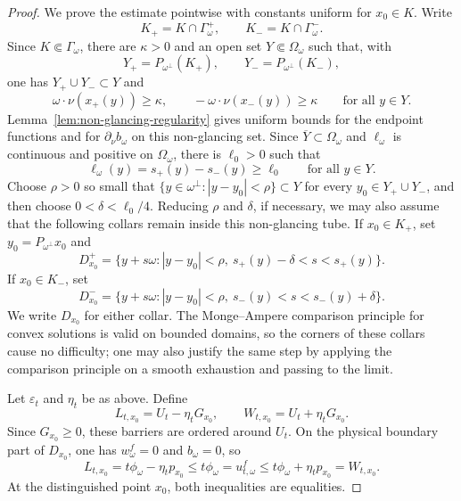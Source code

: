 \documentclass[10pt,a4paper]{amsart}
\begin{document}
\begin{proof}
We prove the estimate pointwise with constants uniform for \(x_0\in K\).  Write
\[
    K_+=K\cap\Gamma_\omega^+,
    \qquad
    K_-=K\cap\Gamma_\omega^- .
\]
Since \(K\Subset\Gamma_\omega\), there are \(\kappa>0\) and an open set \(Y\Subset\Omega_\omega\) such that, with
\[
    Y_+=P_{\omega^\perp}(K_+),
    \qquad
    Y_-=P_{\omega^\perp}(K_-),
\]
one has \(Y_+\cup Y_-\subset Y\) and
\[
    \omega\cdot\nu(x_+(y))\ge\kappa,
    \qquad
    -\omega\cdot\nu(x_-(y))\ge\kappa
    \qquad \text{for all }y\in Y .
\]
Lemma~\ref{lem:non-glancing-regularity} gives uniform bounds for the endpoint functions and for \(\partial_\nu b_\omega\) on this non-glancing set.  Since \(\overline Y\subset\Omega_\omega\) and \(\ell_\omega\) is continuous and positive on \(\Omega_\omega\), there is \(\ell_0>0\) such that
\[
    \ell_\omega(y)=s_+(y)-s_-(y)\ge \ell_0
    \qquad \text{for all }y\in Y .
\]
Choose \(\rho>0\) so small that \(\{y\in\omega^\perp:|y-y_0|<\rho\}\subset Y\) for every \(y_0\in Y_+\cup Y_-\), and then choose \(0<\delta<\ell_0/4\).  Reducing \(\rho\) and \(\delta\), if necessary, we may also assume that the following collars remain inside this non-glancing tube.  If \(x_0\in K_+\), set \(y_0=P_{\omega^\perp}x_0\) and
\begin{equation}\label{eq:plus-boundary-collar}
    D_{x_0}^+
    =
    \{y+s\omega: |y-y_0|<\rho,\ s_+(y)-\delta<s<s_+(y)\}.
\end{equation}
If \(x_0\in K_-\), set
\begin{equation}\label{eq:minus-boundary-collar}
    D_{x_0}^-
    =
    \{y+s\omega: |y-y_0|<\rho,\ s_-(y)<s<s_-(y)+\delta\}.
\end{equation}
We write \(D_{x_0}\) for either collar.  The Monge--Ampere comparison principle for convex solutions is valid on bounded domains, so the corners of these collars cause no difficulty; one may also justify the same step by applying the comparison principle on a smooth exhaustion and passing to the limit.

Let \(\varepsilon_t\) and \(\eta_t\) be as above.  Define
\begin{equation}\label{eq:boundary-local-barriers}
    L_{t,x_0}=U_t-\eta_tG_{x_0},
    \qquad
    W_{t,x_0}=U_t+\eta_tG_{x_0}.
\end{equation}
Since \(G_{x_0}\ge0\), these barriers are ordered around \(U_t\).  On the physical boundary part of \(D_{x_0}\), one has \(w_\omega^f=0\) and \(b_\omega=0\), so
\[
    L_{t,x_0}=t\phi_\omega-\eta_t p_{x_0}
    \le
    t\phi_\omega
    =u_{t,\omega}^f
    \le
    t\phi_\omega+\eta_t p_{x_0}
    =W_{t,x_0}.
\]
At the distinguished point \(x_0\), both inequalities are equalities.


\end{proof}
\end{document}
